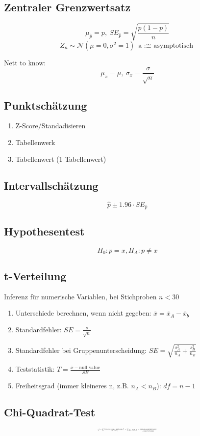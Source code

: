 \documentclass[10pt,a4paper,landscape]{article}
\begin{document}
\begin{multicols}{4}
\subsection{Zentraler Grenzwertsatz}
\[
\mu_{\hat{p}}=p, ~SE_{\hat{p}}=\sqrt{\frac{p(1-p)}{n}}
\]
\[
Z_n \sim \mathcal{N}(\mu = 0, \sigma^2 = 1) ~ \text{a :$\cong$ asymptotisch}
\]

Nett to know:
\[
\mu_x = \mu, ~ \sigma_x = \frac{\sigma}{\sqrt{n}}
\]

\subsection{Punktschätzung}
\begin{enumerate}
\item Z-Score/Standadisieren
\item Tabellenwerk
\item Tabellenwert-(1-Tabellenwert)
\end{enumerate}

\subsection{Intervallschätzung}
\[
\hat{p} \pm 1.96 \cdot SE_{\hat{p}}
\]

\subsection{Hypothesentest}
\[
H_0 : p = x, H_A: p \neq x
\]

\subsection{t-Verteilung}
Inferenz für numerische Variablen, bei Stichproben $n < 30$

\begin{enumerate}
\item Unterschiede berechnen, wenn nicht gegeben: $\bar{x} = \bar{x}_A - \bar{x}_b$
\item Standardfehler: $SE = \frac{s}{\sqrt{n}}$
\item Standardfehler bei Gruppenunterscheidung: $SE = \sqrt{\frac{s_A^2}{n_A} + \frac{s_B^2}{n_B}}$
\item Teststatistik: $T = \frac{\bar{x} - \text{null value}}{SE}$
\item Freiheitsgrad (immer kleineres n, z.B. $n_A < n_B$): $df = n - 1$
\end{enumerate}

\subsection{Chi-Quadrat-Test}
\[\resizebox{0.25\textwidth}{!}{$
\chi^2 = \sum \frac{(\text{observed count}_i-\text{null count}_i)^2}{\text{null count}_i} = \sum Z_i, ~\text{mit } Z_i = \frac{\text{observed} - \text{expected counts}}{\sqrt{\text{expected counts}}}
$}
\]


\end{multicols}
\end{document}
